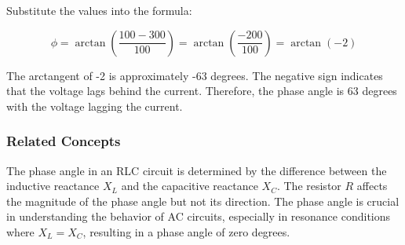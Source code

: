Substitute the values into the formula:

\[
\phi = \arctan\left(\frac{100 - 300}{100}\right) = \arctan\left(\frac{-200}{100}\right) = \arctan(-2)
\]

The arctangent of -2 is approximately -63 degrees. The negative sign indicates that the voltage lags behind the current. Therefore, the phase angle is 63 degrees with the voltage lagging the current.

\subsubsection{Related Concepts}
The phase angle in an RLC circuit is determined by the difference between the inductive reactance \( X_L \) and the capacitive reactance \( X_C \). The resistor \( R \) affects the magnitude of the phase angle but not its direction. The phase angle is crucial in understanding the behavior of AC circuits, especially in resonance conditions where \( X_L = X_C \), resulting in a phase angle of zero degrees.

